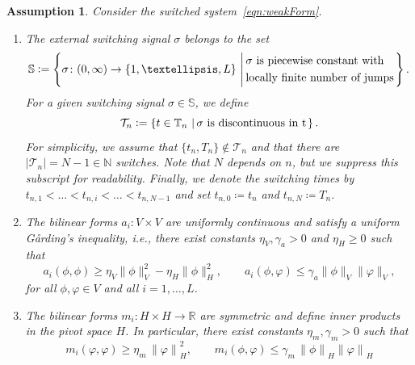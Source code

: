 \documentclass[10pt,a4paper]{amsart}
\newtheorem{assumption}{Assumption}
\newcommand{\N}{\mathbb N}
\newcommand{\R}{\mathbb R}
\newcommand{\addSwitching}{\mathbb{S}}
\newcommand{\calT}{\mathcal{T}}
\newcommand{\coerAH}{\eta_H}
\newcommand{\coerAV}{\eta_V}
\newcommand{\coerM}{\eta_m}
\newcommand{\contA}{\gamma_a}
\newcommand{\contM}{\gamma_m}
\newcommand{\nrModes}{L}
\newcommand{\nrSwitches}{N}
\newcommand{\switch}{\sigma}
\newcommand{\timeInt}{\mathbb{T}}
\begin{document}
\begin{assumption}
	\label{ass:switchedSystem}
	Consider the switched system~\eqref{eqn:weakForm}.
	\begin{enumerate}
		\item\label{ass:switchedSystem:switching} The external switching signal $\switch$ belongs to the set
			\begin{align*}
				\addSwitching \vcentcolon= \left\{\switch\colon (0,\infty)\to \{1,\ldots,\nrModes\} \,\left|\,\begin{aligned}&\switch \text{ is piecewise constant with}\\
				 &\text{locally finite number of jumps}\end{aligned}\right.\right\}.
			\end{align*}
            For a given switching signal $\switch\in\addSwitching$, we define
   \begin{equation}\label{eqn:swi:tim}
				\calT_n \vcentcolon= \left\{t\in \timeInt_n \,\left|\,\switch \text{ is discontinuous in t} \right.\right\}.
    \end{equation}
    For simplicity, we assume that $\{t_n,T_n\}\notin \calT_n$ and that there are $|\calT_n| = \nrSwitches-1\in \N$ switches. Note that $N$ depends on $n$, but we suppress this subscript for readability. Finally, we denote the switching times by $t_{n,1}<\ldots<t_{n,i}<\ldots<t_{n,\nrSwitches-1}$ and set $t_{n,0}\coloneqq t_n$ and $t_{n,N}\coloneqq T_n$.
 		\item\label{ass:switchedSystem:A} The bilinear forms $a_i\colon V\times V$ are uniformly continuous and satisfy a uniform G\r{a}rding's inequality, i.e., there exist constants $\coerAV,\contA>0$ and $\coerAH\geq 0$ such that
        	\begin{equation}
        		\label{eqn:properties:a}
        		a_i(\phi,\phi)\geq \coerAV\|\phi\|_V^2 - \coerAH\|\phi\|_H^2,\qquad
        		a_i(\phi,\varphi) \leq \contA \|\phi\|_V\|\varphi\|_V,
       		 \end{equation}
       		 for all $\phi,\varphi\in V$ and all $i=1,\ldots,\nrModes$.
		\item\label{ass:switchedSystem:M} The bilinear forms $m_i\colon H\times H\to \R$ are symmetric and define inner products in the pivot space $H$. In particular, there exist constants $\coerM,\contM>0$ such that 
			\begin{equation}\nonumber
				m_i(\varphi,\varphi)\geq \coerM\,{\|\varphi\|}_H^2,\qquad
				m_i(\phi,\varphi) \leq \contM\,{\|\phi\|}_H {\|\varphi\|}_H

\end{equation}
\end{enumerate}
\end{assumption}
\end{document}
